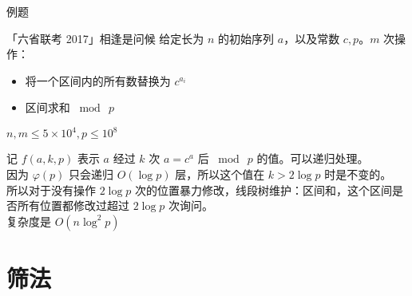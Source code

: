 \documentclass[UTF8]{beamer}
\begin{document}
    \begin{frame}{例题}
        \begin{block}{「六省联考 2017」相逢是问候}
            给定长为 $n$ 的初始序列 $a$，以及常数 $c,p$。$m$ 次操作：\\
            \begin{itemize}
                \item 将一个区间内的所有数替换为 $c^{a_i}$\\
                \item 区间求和 $\bmod\  p$\\
            \end{itemize}
            $n,m\le 5\times 10^4,p\le 10^8$
        \end{block}
        \pause
        记 $f(a,k,p)$ 表示 $a$ 经过 $k$ 次 $a=c^a$ 后 $\bmod\ p$ 的值。可以递归处理。\\
        因为 $\varphi(p)$ 只会递归 $O(\log p)$ 层，所以这个值在 $k>2\log p$ 时是不变的。\\
        \pause
        所以对于没有操作 $2\log p$ 次的位置暴力修改，线段树维护：区间和，这个区间是否所有位置都修改过超过 $2\log p$ 次询问。\\
        复杂度是 $O(n\log^2 p)$
    \end{frame}

    \section{筛法}
\end{document}
